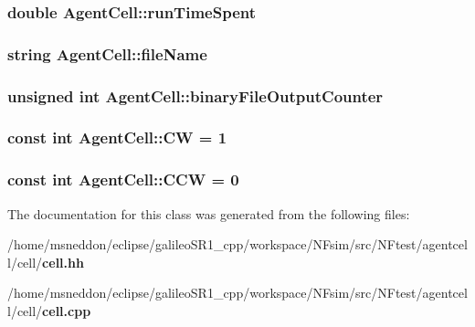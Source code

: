 \subsubsection{\setlength{\rightskip}{0pt plus 5cm}double {\bf AgentCell::runTimeSpent}\hspace{0.3cm}{\tt  [protected]}}\label{classAgentCell_9725a2452ae210e5a955f462424f6647}


\subsubsection{\setlength{\rightskip}{0pt plus 5cm}string {\bf AgentCell::fileName}\hspace{0.3cm}{\tt  [protected]}}\label{classAgentCell_4d90f8d3ef6d92bdcc80c08d4a5d76bd}


\subsubsection{\setlength{\rightskip}{0pt plus 5cm}unsigned int {\bf AgentCell::binaryFileOutputCounter}\hspace{0.3cm}{\tt  [protected]}}\label{classAgentCell_d85403763b8e5872fd2cc4b31dcca62a}


\subsubsection{\setlength{\rightskip}{0pt plus 5cm}const int {\bf AgentCell::CW} = 1\hspace{0.3cm}{\tt  [static, protected]}}\label{classAgentCell_8b0f52b3e8361e09cabc5300f74a2719}


\subsubsection{\setlength{\rightskip}{0pt plus 5cm}const int {\bf AgentCell::CCW} = 0\hspace{0.3cm}{\tt  [static, protected]}}\label{classAgentCell_1e87b6cbd25109779f464c82a7f92958}




The documentation for this class was generated from the following files:\begin{CompactItemize}
\item 
/home/msneddon/eclipse/galileoSR1\_\-cpp/workspace/NFsim/src/NFtest/agentcell/cell/{\bf cell.hh}\item 
/home/msneddon/eclipse/galileoSR1\_\-cpp/workspace/NFsim/src/NFtest/agentcell/cell/{\bf cell.cpp}\end{CompactItemize}
